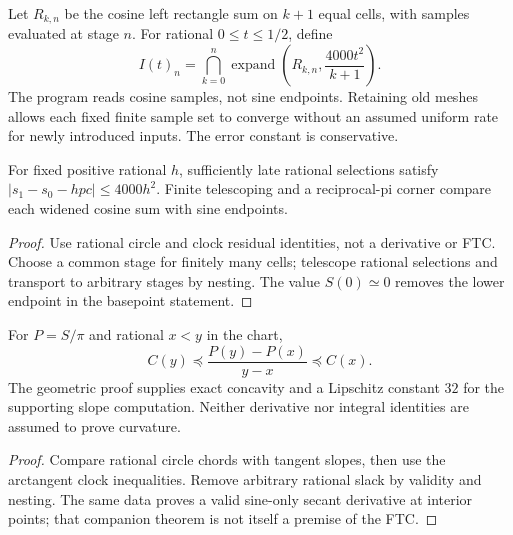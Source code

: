 \begin{definition}\label{def:c3-integral}
\leanok
Let $R_{k,n}$ be the cosine left rectangle sum on $k+1$ equal cells, with
samples evaluated at stage $n$. For rational $0\le t\le1/2$, define
\[
 I(t)_n=\bigcap_{k=0}^{n}
 \operatorname{expand}\left(R_{k,n},\frac{4000t^2}{k+1}\right).
\]
The program reads cosine samples, not sine endpoints. Retaining old meshes
allows each fixed finite sample set to converge without an assumed uniform
rate for newly introduced inputs. The error constant is conservative.
\end{definition}

\begin{lemma}\label{lem:c3-direct}
\leanok
For fixed positive rational $h$, sufficiently late rational selections satisfy
$|s_1-s_0-hpc|\le4000h^2$. Finite telescoping and a reciprocal-pi corner
compare each widened cosine sum with sine endpoints.
\end{lemma}
\begin{proof}\leanok
Use rational circle and clock residual identities, not a derivative or FTC.
Choose a common stage for finitely many cells; telescope rational selections
and transport to arbitrary stages by nesting. The value $S(0)\simeq0$
removes the lower endpoint in the basepoint statement.
\end{proof}

\begin{lemma}\label{lem:c3-concavity}
\leanok
For $P=S/\pi$ and rational $x<y$ in the chart,
\[
 C(y)\preceq\frac{P(y)-P(x)}{y-x}\preceq C(x).
\]
The geometric proof supplies exact concavity and a Lipschitz constant $32$
for the supporting slope computation. Neither derivative nor integral
identities are assumed to prove curvature.
\end{lemma}
\begin{proof}\leanok
Compare rational circle chords with tangent slopes, then use the arctangent
clock inequalities. Remove arbitrary rational slack by validity and nesting.
The same data proves a valid sine-only secant derivative at interior points;
that companion theorem is not itself a premise of the FTC.
\end{proof}

